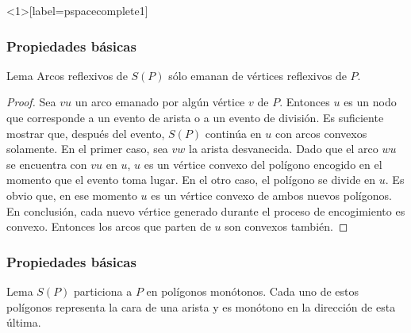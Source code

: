 \documentclass[notes=show]{beamer}
\begin{document}
\begin{frame}
<1>[label=pspacecomplete1] 
\frametitle{Propiedades b\'asicas}

\begin{block}{Lema}
Arcos reflexivos de $S(P)$ s\'olo emanan de v\'ertices reflexivos de $P$.
\end{block}

\begin{overprint}
\hyperlink{pspacecomplete1<2>}{}


\begin{proof}
\small {Sea $vu$ un arco emanado por alg\'un v\'ertice $v$ de $P$. Entonces $u$ es un 
nodo que corresponde a un evento de arista o a un evento de divisi\'on. Es suficiente 
mostrar que, despu\'es del evento, $S(P)$ contin\'ua en $u$ con arcos convexos
solamente.\newline \newline}
 \small{En el primer caso, sea $vw$ la arista desvanecida. Dado que el arco $wu$ se 
encuentra con $vu$ en $u$, $u$ es un v\'ertice convexo del pol\'igono encogido en el momento 
que el evento toma lugar. En el otro caso, el pol\'igono se divide en $u$. Es obvio que, en 
ese momento $u$ es un v\'ertice convexo de ambos nuevos pol\'igonos.\newline \newline}
 \small{En conclusi\'on, cada nuevo v\'ertice generado durante el proceso de encogimiento es 
convexo. Entonces los arcos que parten de $u$ son convexos tambi\'en.}\end{proof}

\end{overprint}
\transdissolve[duration=0.4]
\end{frame}



\begin{frame}
\frametitle{Propiedades b\'asicas}

\begin{block}{Lema}
$S(P)$ particiona a $P$ en pol\'igonos mon\'otonos. Cada uno de estos pol\'igonos representa 
la cara de una arista y es mon\'otono en la direcci\'on de esta \'ultima.
\end{block}
\transdissolve[duration=0.4]
\end{frame}
\end{document}
